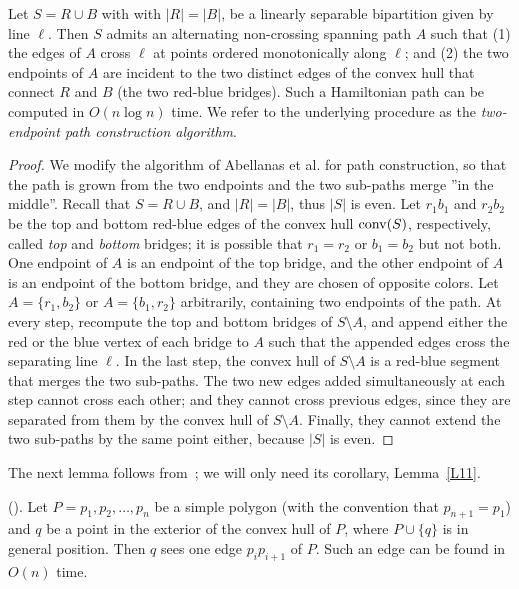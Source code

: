 \documentclass[proceedings]{stacs}
\begin{document}
\begin{lemma}\label{L9}
Let $S=R \cup B$ with with $|R|=|B|$, be a linearly separable bipartition
given by line $\ell$. Then $S$ admits an alternating non-crossing
spanning path $A$ such that
(1) the edges of $A$ cross $\ell$ at points ordered monotonically
along $\ell$; and (2) the two endpoints of $A$ are incident to the two
distinct edges of the convex hull that connect $R$ and $B$ (the two
red-blue bridges). Such a Hamiltonian path can be computed in $O(n \log{n})$ time.
We refer to the underlying procedure as the {\em two-endpoint path
construction algorithm}.
\end{lemma}
\begin{proof}
We modify the algorithm of Abellanas et al. for path construction, so
that the path is grown from the two endpoints and the two sub-paths merge ''in
the middle''.
Recall that  $S=R \cup B$, and $|R|=|B|$, thus $|S|$ is even.
Let $r_1 b_1$ and $r_2 b_2$ be the top and bottom red-blue edges of
the convex hull ${\rm conv}(S)$, respectively, called {\em top} and {\em bottom}
bridges; it is possible that $r_1=r_2$ or  $b_1=b_2$ but not both.
One endpoint of $A$ is an endpoint of the top bridge, and the other
endpoint of $A$ is an endpoint of the bottom bridge, and they are
chosen of opposite colors.
Let $A=\{r_1,b_2\}$ or $A=\{b_1,r_2\}$ arbitrarily,
containing two endpoints of the path. At every step, recompute
the top and bottom bridges of $S \setminus A$, and append either
the red or the blue vertex of each bridge to $A$ such that the appended
edges cross the separating line $\ell$. In the last step, the convex hull of
$S\setminus A$ is a red-blue segment that merges the two sub-paths.
The two new edges added simultaneously at each step
cannot cross each other; and they cannot cross previous edges, since they are
separated from them by the convex hull of $S\setminus A$. Finally, they cannot
extend the two sub-paths by the same point either, because $|S|$ is even.
\end{proof}

The next lemma follows from~\cite[Lemma~2.1]{HKRT08}; we will only need its
corollary, Lemma~\ref{L11}.

\begin{lemma} {\rm(\cite{HKRT08}).} \label{L10}
Let $P=p_1, p_2, \ldots, p_n$ be a simple polygon (with the convention
that $p_{n+1}=p_1$) and $q$ be a point in the exterior of the convex
hull of $P$, where $P \cup \{q\}$  is in general position. Then $q$
sees one edge $p_i p_{i+1}$ of $P$. Such an edge can be found in $O(n)$ time.
\end{lemma}
\end{document}
